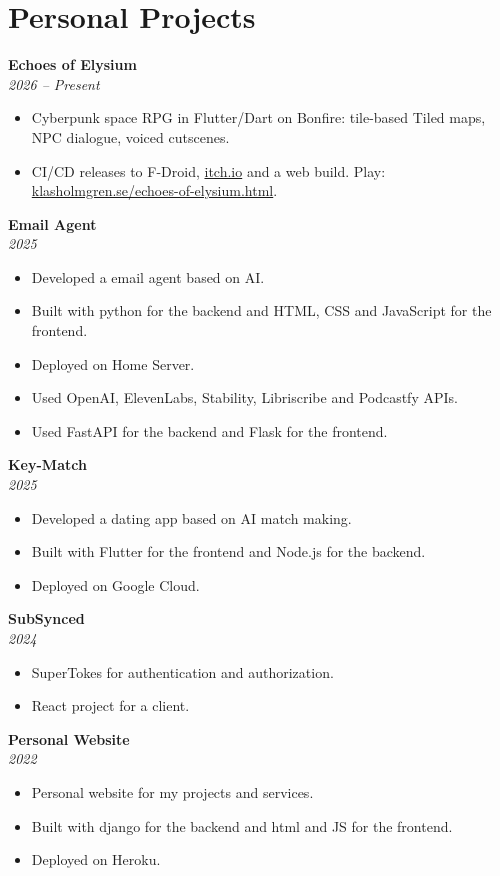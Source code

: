 \documentclass[letterpaper,11pt]{article}
\newenvironment{bullets}{\begin{itemize}[leftmargin=24.1pt,labelsep=5.47pt,label=$\vcenter{\hbox{\tiny$\bullet$}}$,topsep=0pt,itemsep=0pt,parsep=0pt,partopsep=0pt]}{\end{itemize}\vspace{3.5pt}}
\newcommand{\project}[2]{{\large\bfseries #1}\\{\large\itshape #2}\par\vspace{1.2pt}}
\begin{document}
\section{Personal Projects}
\project{Echoes of Elysium}{2026 -- Present}
\begin{bullets}
  \item Cyberpunk space RPG in Flutter/Dart on Bonfire: tile-based Tiled maps, NPC dialogue, voiced cutscenes.
  \item CI/CD releases to F-Droid, \href{https://klas96.itch.io/echoes-of-elysium}{itch.io} and a web build. Play: \href{https://klasholmgren.se/echoes-of-elysium.html}{klasholmgren.se/echoes-of-elysium.html}.
\end{bullets}\vspace{1.5pt}
\project{Email Agent}{2025}
\begin{bullets}
  \item Developed a email agent based on AI.
  \item Built with python for the backend and HTML, CSS and JavaScript for the frontend.
  \item Deployed on Home Server.
  \item Used OpenAI, ElevenLabs, Stability, Libriscribe and Podcastfy APIs.
  \item Used FastAPI for the backend and Flask for the frontend.
\end{bullets}\vspace{1.5pt}
\project{Key-Match}{2025}
\begin{bullets}
  \item Developed a dating app based on AI match making.
  \item Built with Flutter for the frontend and Node.js for the backend.
  \item Deployed on Google Cloud.
\end{bullets}\vspace{1.5pt}
\project{SubSynced}{2024}
\begin{bullets}
  \item SuperTokes for authentication and authorization.
  \item React project for a client.
\end{bullets}\vspace{1.5pt}
\project{Personal Website}{2022}
\begin{bullets}
  \item Personal website for my projects and services.
  \item Built with django for the backend and html and JS for the frontend.
  \item Deployed on Heroku.
\end{bullets}\vspace{1.5pt}
\end{document}
